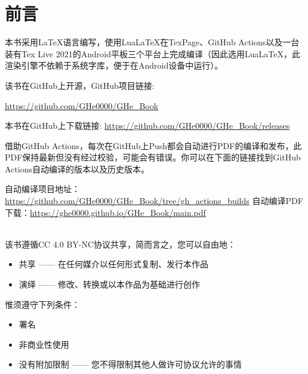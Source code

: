 \documentclass{gbook}
\begin{document}
 

\newpage

\section{前言}

本书采用\LaTeX 语言编写，使用Lua\LaTeX 在TexPage、GitHub Actions以及一台装有Tex Live 2021的Android平板三个平台上完成编译（因此选用Lua\LaTeX，此渲染引擎不依赖于系统字库，便于在Android设备中运行）。
~\\

\begin{minipage}[b]{0.6\linewidth}
该书在GitHub上开源，GitHub项目链接:

\url{https://github.com/GHe0000/GHe_Book} 
\end{minipage}
\hfill
\begin{minipage}[b]{0.1\linewidth}
\end{minipage}

本书在GitHub上下载链接:
\url{https://github.com/GHe0000/GHe_Book/releases} 

借助GitHub Actions，每次在GitHub上Push都会自动进行PDF的编译和发布，此PDF保持最新但没有经过校验，可能会有错误。你可以在下面的链接找到GitHub Actions自动编译的版本以及历史版本。

自动编译项目地址：\url{https://github.com/GHe0000/GHe_Book/tree/gh_actions_builds}
自动编译PDF下载：\url{https://ghe0000.github.io/GHe_Book/main.pdf}

~\\

该书遵循CC 4.0 BY-NC协议共享，简而言之，您可以自由地：
\begin{itemize}
    \item 共享 —— 在任何媒介以任何形式复制、发行本作品
    \item 演绎 —— 修改、转换或以本作品为基础进行创作
\end{itemize}

惟须遵守下列条件：
\begin{itemize}
    \item 署名
    \item 非商业性使用
    \item 没有附加限制 —— 您不得限制其他人做许可协议允许的事情
\end{itemize}


\tableofcontents
\end{document}
